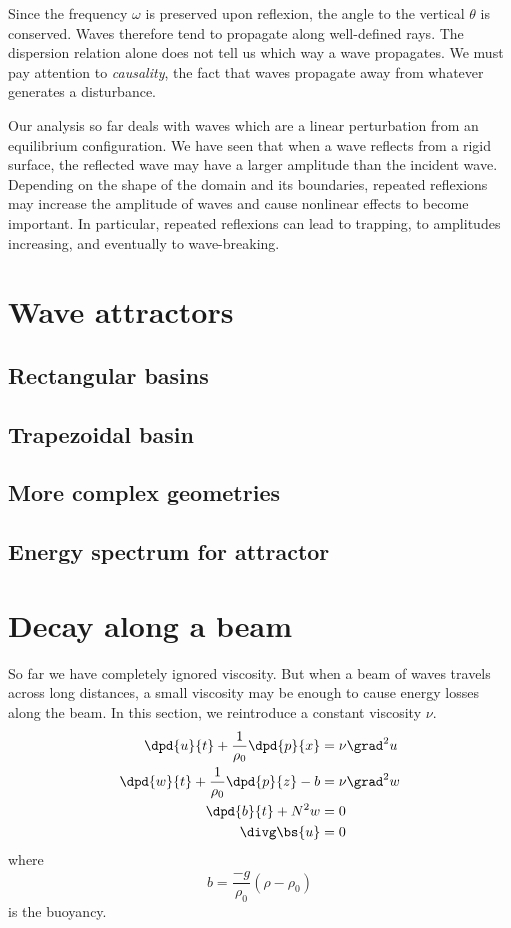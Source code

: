 Since the frequency $\omega$ is preserved upon reflexion, the angle to the vertical $\theta$ is conserved. Waves therefore tend to propagate along well-defined rays. The dispersion relation alone does not tell us which way a wave propagates. We must pay attention to \textit{causality}, the fact that waves propagate away from whatever generates a disturbance. 

Our analysis so far deals with waves which are a linear perturbation from an equilibrium configuration. We have seen that when a wave reflects from a rigid surface, the reflected wave may have a larger amplitude than the incident wave. Depending on the shape of the domain and its boundaries, repeated reflexions may increase the amplitude of waves and cause nonlinear effects to become important. In particular, repeated reflexions can lead to trapping, to amplitudes increasing, and eventually to wave-breaking. 

\section{Wave attractors}
\subsection{Rectangular basins}
\subsection{Trapezoidal basin}
\subsection{More complex geometries}
\subsection{Energy spectrum for attractor}

\section{Decay along a beam}

So far we have completely ignored viscosity. But when a beam of waves
travels across long distances, a small viscosity may be enough to cause energy
losses along the beam. In this section, we reintroduce a constant viscosity
$\nu$. 
\begin{align}
	\dpd{u}{t} + \frac{1}{\rho_0}\dpd{p}{x} &= \nu\grad^2 u \\
	\dpd{w}{t} + \frac{1}{\rho_0}\dpd{p}{z} - b &= \nu\grad^2 w \\
	\dpd{b}{t} + N^2w &= 0 \\
	\divg\bs{u} &= 0
\end{align}
where 
\begin{equation}
	b = \displaystyle\frac{-g}{\rho_0} (\rho-\rho_0)
\end{equation}
is the buoyancy. 

